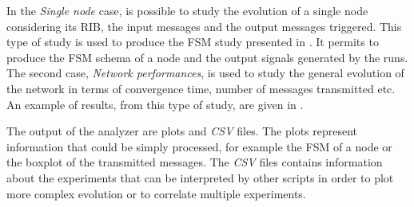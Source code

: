 In the \textit{Single node} case, is possible to study the evolution of a single
node considering its \ac{RIB}, the input messages and the output messages triggered.
This type of study is used to produce the \ac{FSM} study presented in .
It permits to produce the \ac{FSM} schema of a node and the output signals
generated by the runs.
The second case, \textit{Network performances}, is used to study the general
evolution of the network in terms of convergence time, number of messages
transmitted etc.
An example of results, from this type of study, are given in .

The output of the analyzer are plots and \textit{CSV} files.
The plots represent information that could be simply processed, for example
the \ac{FSM} of a node or the boxplot of the transmitted messages.
The \textit{CSV} files contains information about the experiments that can be
interpreted by other scripts in order to plot more complex evolution or to
correlate multiple experiments.

